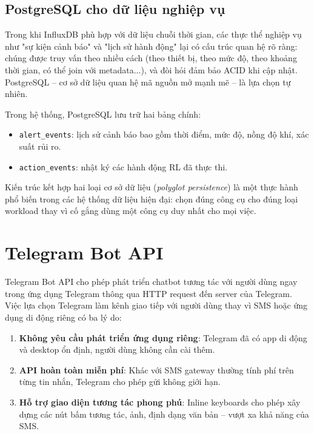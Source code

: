 \subsection{PostgreSQL cho dữ liệu nghiệp vụ}

Trong khi InfluxDB phù hợp với dữ liệu chuỗi thời gian, các thực thể nghiệp vụ như "sự kiện cảnh báo" và "lịch sử hành động" lại có cấu trúc quan hệ rõ ràng: chúng được truy vấn theo nhiều cách (theo thiết bị, theo mức độ, theo khoảng thời gian, có thể join với metadata...), và đòi hỏi đảm bảo ACID khi cập nhật. PostgreSQL – cơ sở dữ liệu quan hệ mã nguồn mở mạnh mẽ – là lựa chọn tự nhiên.

Trong hệ thống, PostgreSQL lưu trữ hai bảng chính:
\begin{itemize}
  \item \texttt{alert\_events}: lịch sử cảnh báo bao gồm thời điểm, mức độ, nồng độ khí, xác suất rủi ro.
  \item \texttt{action\_events}: nhật ký các hành động RL đã thực thi.
\end{itemize}

Kiến trúc kết hợp hai loại cơ sở dữ liệu (\textit{polyglot persistence}) là một thực hành phổ biến trong các hệ thống dữ liệu hiện đại: chọn đúng công cụ cho đúng loại workload thay vì cố gắng dùng một công cụ duy nhất cho mọi việc.

\section{Telegram Bot API}

Telegram Bot API cho phép phát triển chatbot tương tác với người dùng ngay trong ứng dụng Telegram thông qua HTTP request đến server của Telegram. Việc lựa chọn Telegram làm kênh giao tiếp với người dùng thay vì SMS hoặc ứng dụng di động riêng có ba lý do:

\begin{enumerate}
  \item \textbf{Không yêu cầu phát triển ứng dụng riêng}: Telegram đã có app di động và desktop ổn định, người dùng không cần cài thêm.
  \item \textbf{API hoàn toàn miễn phí}: Khác với SMS gateway thường tính phí trên từng tin nhắn, Telegram cho phép gửi không giới hạn.
  \item \textbf{Hỗ trợ giao diện tương tác phong phú}: Inline keyboards cho phép xây dựng các nút bấm tương tác, ảnh, định dạng văn bản – vượt xa khả năng của SMS.
\end{enumerate}


